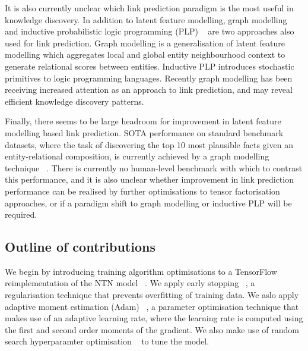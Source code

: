 \noindent It is also currently unclear which link prediction paradigm is the most useful in knowledge discovery. In addition to latent feature modelling, graph modelling \unskip~\citep{niepert2016discriminative, schlichtkrull2018modeling, pinter2018predicting} and inductive probabilistic logic programming (PLP) \unskip~\citep{speichert2018learning} are two approaches also used for link prediction. Graph modelling is a generalisation of latent feature modelling which aggregates local and global entity neighbourhood context to generate relational scores between entities. Inductive PLP introduces stochastic primitives to logic programming languages. Recently graph modelling has been receiving increased attention as an approach to link prediction, and may reveal efficient knowledge discovery patterns. \par

\noindent Finally, there seems to be large headroom for improvement in latent feature modelling based link prediction. SOTA performance on standard benchmark datasets, where the task of discovering the top 10 most plausible facts given an entity-relational composition, is currently achieved by a graph modelling technique \unskip~\citep{ruderNLPProg}. There is currently no human-level benchmark with which to contrast this performance, and it is also unclear whether improvement in link prediction performance can be realised by further optimisations to tensor factorisation approaches, or if a paradigm shift to graph modelling or inductive PLP will be required.  

\subsection{Outline of contributions}

We begin by introducing training algorithm optimisations to a TensorFlow \unskip~\citep{abadi2016tensorflow} reimplementation of the NTN model \unskip~\citep{Doss2015}.  We apply early stopping \unskip~\citep{prechelt1998early}, a regularisation technique that prevents overfitting of training data. We aslo apply adaptive moment estimation (Adam)  \unskip~\citep{kingma2014adam}, a parameter optimisation technique that makes use of an adaptive learning rate, where the learning rate is computed using the first and second order moments of the gradient. We also make use of random search hyperparamter optimisation \unskip~\citep{bergstra2012random} to tune the model. \par


